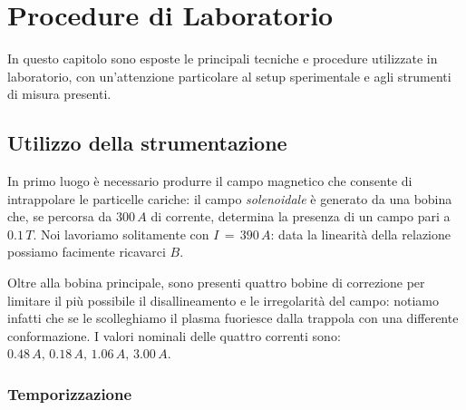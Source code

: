 \chapter{Procedure di Laboratorio}

In questo capitolo sono esposte le principali tecniche e procedure utilizzate in laboratorio, con un'attenzione particolare
al setup sperimentale e agli strumenti di misura presenti. 

\section{Utilizzo della strumentazione}

In primo luogo è necessario produrre il campo magnetico che consente di intrappolare le particelle cariche: il campo \textit{solenoidale} 
è generato da una bobina che, se percorsa da $300\,A$ di corrente, determina la presenza di un campo pari a $0.1\,T$. Noi 
lavoriamo solitamente con $I\,=\,390\,A$: data la linearità della relazione possiamo facimente ricavarci $B$.

Oltre alla bobina principale, sono presenti quattro bobine di correzione per limitare il più possibile il disallineamento e le
irregolarità del campo: notiamo infatti che se le scolleghiamo il plasma fuoriesce dalla trappola con una differente conformazione.
I valori nominali delle quattro correnti sono: $0.48\,A,\,0.18\,A,\,1.06\,A,\,3.00\,A$.

\subsection{Temporizzazione}

